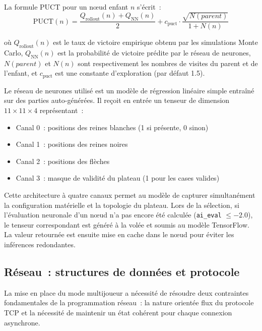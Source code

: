 \documentclass[a4paper]{article}
\begin{document}
La formule PUCT pour un nœud enfant $n$ s'écrit~:
$$ \text{PUCT}(n) = \frac{Q_{\text{rollout}}(n) + Q_{\text{NN}}(n)}{2} + c_{\text{puct}} \cdot \frac{\sqrt{N(parent)}}{1 + N(n)} $$

où $Q_{\text{rollout}}(n)$ est le taux de victoire empirique obtenu par les simulations Monte Carlo, $Q_{\text{NN}}(n)$ est la probabilité de victoire prédite par le réseau de neurones, $N(parent)$ et $N(n)$ sont respectivement les nombres de visites du parent et de l'enfant, et $c_{\text{puct}}$ est une constante d'exploration (par défaut 1.5).

Le réseau de neurones utilisé est un modèle de régression linéaire simple entraîné sur des parties auto-générées. Il reçoit en entrée un tenseur de dimension $11 \times 11 \times 4$ représentant~:
\begin{itemize}
    \item Canal 0~: positions des reines blanches (1 si présente, 0 sinon)
    \item Canal 1~: positions des reines noires
    \item Canal 2~: positions des flèches
    \item Canal 3~: masque de validité du plateau (1 pour les cases valides)
\end{itemize}

Cette architecture à quatre canaux permet au modèle de capturer simultanément la configuration matérielle et la topologie du plateau. Lors de la sélection, si l'évaluation neuronale d'un nœud n'a pas encore été calculée (\texttt{ai\_eval} $\leq -2.0$), le tenseur correspondant est généré à la volée et soumis au modèle TensorFlow. La valeur retournée est ensuite mise en cache dans le nœud pour éviter les inférences redondantes.


 
 
\subsection{Réseau~: structures de données et protocole}
\label{sec:network-data}
 
La mise en place du mode multijoueur a nécessité de résoudre deux contraintes
fondamentales de la programmation réseau~: la nature orientée flux du protocole
TCP et la nécessité de maintenir un état cohérent pour chaque connexion
asynchrone.
 
\end{document}

